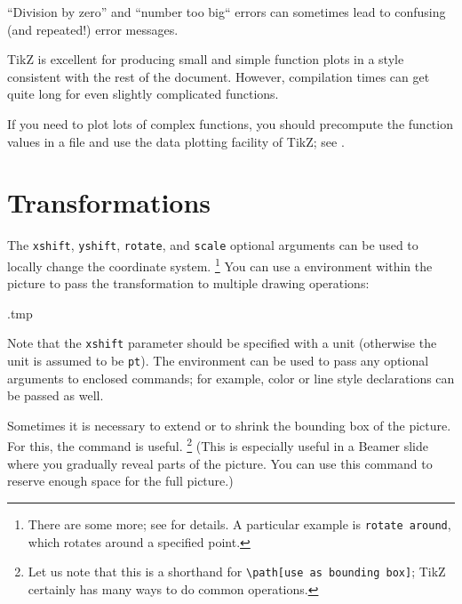 \begin{warning}
``Division by zero'' and ``number too big`` errors
can sometimes lead to confusing (and repeated!) error messages.
\end{warning}

\begin{practices}
TikZ is excellent for producing small and simple function plots
in a style consistent with the rest of the document.
However, compilation times can get quite long for even slightly complicated functions.

If you need to plot lots of complex functions,
you should precompute the function values in a file
and use the data plotting facility of TikZ; see \cite[Section~22]{tikz}.
\end{practices}



%
%
\section{Transformations}

The \verb|xshift|, \verb|yshift|, \verb|rotate|, and \verb|scale| optional arguments
can be used to locally change the coordinate system.%
\footnote{There are some more; see \cite[Section~25.3]{tikz} for details.
A particular example is \texttt{rotate around}, which rotates around a specified point.}
You can use a  environment within the picture
to pass the transformation to multiple drawing operations:
%
\begin{VerbatimOut}{\jobname.tmp}
\centering
{}
\end{VerbatimOut}
\ShowExampleBelow[2]
%
Note that the \verb|xshift| parameter should be specified with a unit
(otherwise the unit is assumed to be \verb|pt|).
The  environment can be used to pass any optional arguments to enclosed commands;
for example, color or line style declarations can be passed as well.

Sometimes it is necessary to extend or to shrink the bounding box of the picture.
For this, the  command is useful.%
\footnote{Let us note that this is a shorthand for
\texttt{\textbackslash{}path[use as bounding box]};
TikZ certainly has many ways to do common operations.}
(This is especially useful in a Beamer slide where you gradually reveal parts of the picture.
You can use this command to reserve enough space for the full picture.)

